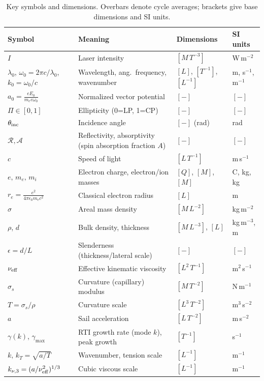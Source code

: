\documentclass[aps,pre,twocolumn,showpacs,superscriptaddress]{revtex4-2}
\theoremstyle{definition}
\begin{document}
\begin{table}[t]
\caption{Key symbols and dimensions. Overbars denote cycle averages; brackets give base dimensions and SI units.}
\label{tab:dim}
\begin{ruledtabular}
\begin{tabular}{llll}
Symbol & Meaning & Dimensions & SI units \\
\hline
$I$ & Laser intensity & $[M\,T^{-3}]$ & W\,m$^{-2}$ \\
$\lambda_0$, $\omega_0=2\pi c/\lambda_0$, $k_0=\omega_0/c$ & Wavelength, ang.\ frequency, wavenumber & $[L]$, $[T^{-1}]$, $[L^{-1}]$ & m, s$^{-1}$, m$^{-1}$ \\
$a_0=\frac{e E_0}{m_e c \omega_0}$ & Normalized vector potential & $[-]$ & $[-]$ \\
$\Pi\in[0,1]$ & Ellipticity (0=LP, 1=CP) & $[-]$ & $[-]$ \\
$\theta_{\rm inc}$ & Incidence angle & $[-]$ (rad) & rad \\
$\mathcal{R},\mathcal{A}$ & Reflectivity, absorptivity (spin absorption fraction $A$) & $[-]$ & $[-]$ \\
$c$ & Speed of light & $[L\,T^{-1}]$ & m\,s$^{-1}$ \\
$e,\,m_e,\,m_i$ & Electron charge, electron/ion masses & $[Q]$, $[M]$, $[M]$ & C, kg, kg \\
$r_e=\frac{e^2}{4\pi\epsilon_0 m_e c^2}$ & Classical electron radius & $[L]$ & m \\
$\sigma$ & Areal mass density & $[M\,L^{-2}]$ & kg\,m$^{-2}$ \\
$\rho$, $d$ & Bulk density, thickness & $[M\,L^{-3}]$, $[L]$ & kg\,m$^{-3}$, m \\
$\epsilon=d/L$ & Slenderness (thickness/lateral scale) & $[-]$ & $[-]$ \\
$\nu_{\rm eff}$ & Effective kinematic viscosity & $[L^2\,T^{-1}]$ & m$^2$\,s$^{-1}$ \\
$\sigma_s$ & Curvature (capillary) modulus & $[M\,T^{-2}]$ & N\,m$^{-1}$ \\
$T=\sigma_s/\rho$ & Curvature scale & $[L^3\,T^{-2}]$ & m$^{3}$\,s$^{-2}$ \\
$a$ & Sail acceleration & $[L\,T^{-2}]$ & m\,s$^{-2}$ \\
$\gamma(k)$, $\gamma_{\max}$ & RTI growth rate (mode $k$), peak growth & $[T^{-1}]$ & s$^{-1}$ \\
$k,\,k_T=\sqrt{a/T}$ & Wavenumber, tension scale & $[L^{-1}]$ & m$^{-1}$ \\
$k_{\nu,3}=(a/\nu_{\rm eff}^2)^{1/3}$ & Cubic viscous scale & $[L^{-1}]$ & m$^{-1}$ \\

\end{tabular}
\end{ruledtabular}
\end{table}
\end{document}
